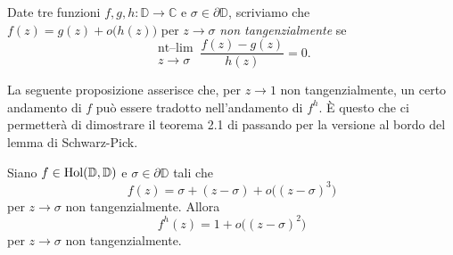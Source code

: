 \begin{defn}
  Date tre funzioni $f,g,h: \mathbb{D} \longrightarrow \mathbb{C}$ e $\sigma \in \partial \mathbb{D}$, scriviamo che $f(z)=g(z)+o\bigl(h(z)\bigr)$ per $z \longrightarrow \sigma$ \textit{non tangenzialmente} se
  $$\substack{\text{nt--lim} \\ z \longrightarrow \sigma} \, \frac{f(z)-g(z)}{h(z)}=0.$$
\end{defn}

La seguente proposizione asserisce che, per $z \longrightarrow 1$ non tangenzialmente, un certo andamento di $f$ può essere tradotto nell'andamento di $f^h$. È questo che ci permetterà di dimostrare il teorema 2.1 di \cite{BK} passando per la versione al bordo del lemma di Schwarz-Pick.

\begin{prop} \label{o^3->o^2}
  Siano $f \in \text{\normalfont{Hol}}(\mathbb{D},\mathbb{D})$ e $\sigma \in \partial\mathbb{D}$ tali che
  \begin{equation} \label{o^3}
    f(z)=\sigma+(z-\sigma)+o\bigl((z-\sigma)^3\bigr)
  \end{equation}
  per $z \longrightarrow \sigma$ non tangenzialmente. Allora
  \begin{equation} \label{o^2}
    f^h(z)=1+o\bigl((z-\sigma)^2\bigr)
  \end{equation}
  per $z \longrightarrow \sigma$ non tangenzialmente.
\end{prop}

